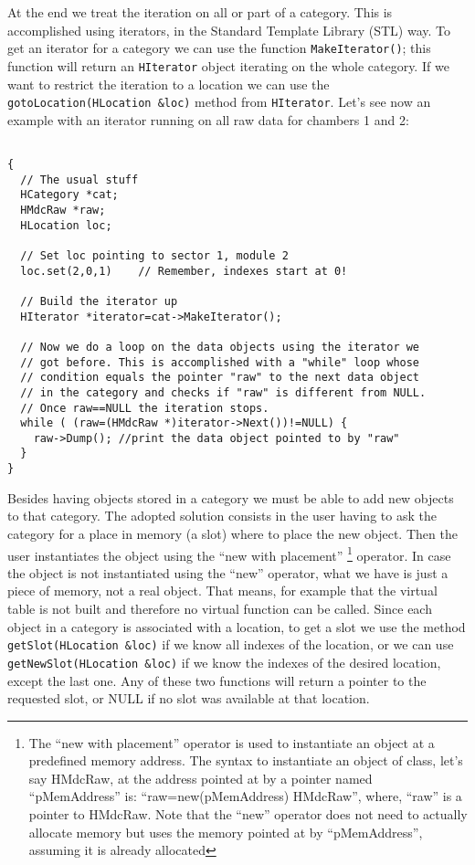 At the end we treat the iteration on all or part of a category. This 
is accomplished using iterators, in the Standard Template Library 
(STL) way. To get an iterator for a category we can use the function 
\verb+MakeIterator()+; this function will return an \verb+HIterator+ 
object iterating on the whole category. If we want to restrict the 
iteration to a location we can use the \verb+gotoLocation(HLocation &loc)+ 
method from \verb+HIterator+. Let's see now an example with an iterator 
running on all raw data for chambers 1 and 2:

\begin{lstlisting}

{
  // The usual stuff
  HCategory *cat;
  HMdcRaw *raw;
  HLocation loc;

  // Set loc pointing to sector 1, module 2
  loc.set(2,0,1)    // Remember, indexes start at 0!

  // Build the iterator up
  HIterator *iterator=cat->MakeIterator();

  // Now we do a loop on the data objects using the iterator we
  // got before. This is accomplished with a "while" loop whose
  // condition equals the pointer "raw" to the next data object
  // in the category and checks if "raw" is different from NULL.
  // Once raw==NULL the iteration stops.
  while ( (raw=(HMdcRaw *)iterator->Next())!=NULL) {
    raw->Dump(); //print the data object pointed to by "raw" 
  }
}
\end{lstlisting}

Besides having objects stored in a category we must be able to add 
new objects to that category. The adopted solution consists in the 
user having to ask the category for a place in memory (a slot) where 
to place the new object. Then the user instantiates the object using 
the ``new with placement'' \footnote{The ``new with placement'' 
operator is used to instantiate an object at a predefined memory 
address. The syntax to instantiate an object of class, let's say 
HMdcRaw, at the address pointed at by a pointer named ``pMemAddress'' 
is: ``raw=new(pMemAddress) HMdcRaw'', where, ``raw'' is a pointer 
to HMdcRaw. Note that the ``new'' operator does not need to actually 
allocate memory but uses the memory pointed at by ``pMemAddress'', 
assuming it is already allocated} operator. In case the object is not 
instantiated using the ``new'' operator, what we have is just a piece 
of memory, not a real object. That means, for example that the virtual 
table is not built and therefore no virtual function can be called. 
Since each object in a category is associated with a location, to get 
a slot we use the method \verb+getSlot(HLocation &loc)+ if we know all 
indexes of the location, or we can use \verb+getNewSlot(HLocation &loc)+ 
if we know the indexes of the desired location, except the last one. 
Any of these two functions will return a pointer to the requested slot, 
or NULL if no slot was available at that location.

